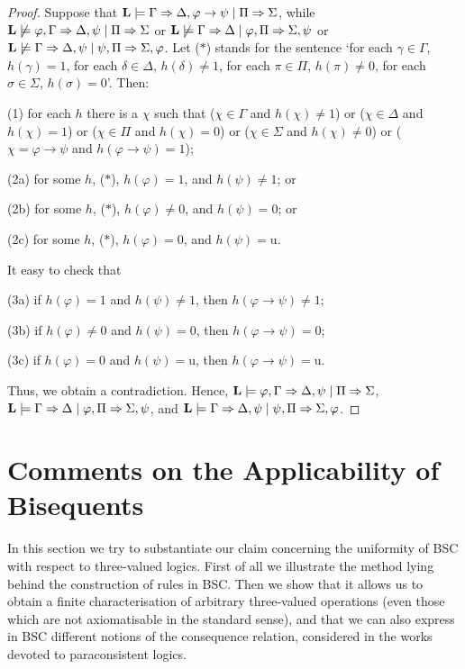 \documentclass[11pt,a4paper,titlepage]{article}
\theoremstyle{definition}
\newcommand{\3}{\vspace{.3in}}
\newcommand{\2}{\vspace{.2in}}
\newcommand{\1}{\vspace{.1in}}
\newcommand{\5}{\vspace{.05in}}
\begin{document}
\begin{proof}
Suppose that $ {\bf L}\models \Gamma\Rightarrow\Delta,\varphi\rightarrow\psi\mid\Pi\Rightarrow\Sigma$, while $ {\bf L}\not\models \varphi,\Gamma\Rightarrow\Delta,\psi\mid\Pi\Rightarrow\Sigma$ or $ {\bf L}\not\models \Gamma\Rightarrow\Delta\mid\varphi,\Pi\Rightarrow\Sigma,\psi$ or $ {\bf L}\not\models \Gamma\Rightarrow\Delta,\psi\mid\psi,\Pi\Rightarrow\Sigma,\varphi$. Let ($ \ast $) stands for the sentence `for each $ \gamma\in\Gamma $, $h(\gamma)=1$, for each $ \delta\in\Delta $, $ h(\delta)\not=1 $, for each $ \pi\in\Pi $, $ h(\pi)\not=0 $, for each $ \sigma\in\Sigma $, $ h(\sigma)=0 $'. Then:

(1) for each $ h $ there is a $ \chi $ such that ($ \chi\in\Gamma $ and $ h(\chi)\not=1 $) or ($ \chi\in\Delta $ and $ h(\chi)=1 $) or ($ \chi\in\Pi $ and $ h(\chi)=0$) or ($ \chi\in\Sigma $ and $ h(\chi)\not=0 $) or ($ \chi=\varphi\rightarrow\psi $ and $ h(\varphi\rightarrow\psi)=1 $);

(2a) for some $ h $, ($ \ast $), $ h(\varphi)=1$, and $ h(\psi)\not=1$; or 

(2b) for some $ h $, ($ \ast $), $ h(\varphi)\not=0$, and $ h(\psi)=0$; or 

(2c) for some $ h $, ($ \ast $), $ h(\varphi)=0$, and $ h(\psi)=\mathrm{u}$.

It easy to check that

(3a) if $ h(\varphi)=1$ and $ h(\psi)\not=1$, then $ h(\varphi\rightarrow\psi)\not=1 $;

(3b) if $ h(\varphi)\not=0$ and $ h(\psi)=0$, then $ h(\varphi\rightarrow\psi)=0$;

(3c) if $ h(\varphi)=0$ and $ h(\psi)=\mathrm{u}$, then $ h(\varphi\rightarrow\psi)=\mathrm{u}$.

Thus, we obtain a contradiction. Hence, $ {\bf L}\models \varphi,\Gamma\Rightarrow\Delta,\psi\mid\Pi\Rightarrow\Sigma$, $ {\bf L}\models \Gamma\Rightarrow\Delta\mid\varphi,\Pi\Rightarrow\Sigma,\psi$, and $ {\bf L}\models \Gamma\Rightarrow\Delta,\psi\mid\psi,\Pi\Rightarrow\Sigma,\varphi$. 
\end{proof}


\section{Comments on the Applicability of Bisequents}\label{Comments}

In this section we try to substantiate our claim concerning the uniformity of BSC with respect to three-valued logics. First of all we illustrate the method lying behind the construction of rules in BSC. Then we show that it allows us to obtain a finite characterisation of arbitrary three-valued operations (even those which are not axiomatisable in the standard sense), and that we can also express in BSC different notions of the consequence relation, considered in the works devoted to paraconsistent logics.
\end{document}
